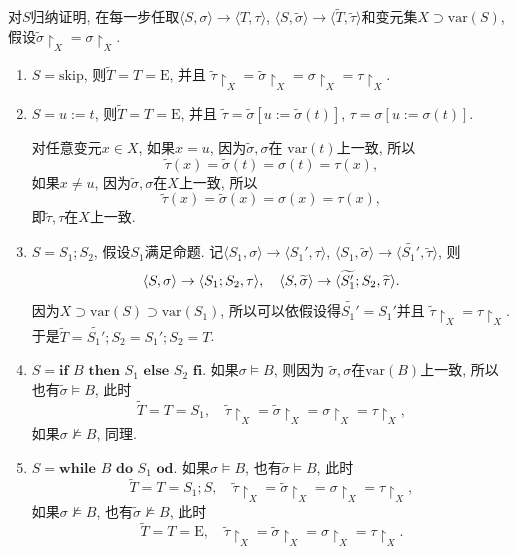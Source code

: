 \documentclass[UTF8]{ctexart}
\begin{document}
对$S$归纳证明, 在每一步任取$\langle S,\sigma\rangle\to\langle T,\tau\rangle$,
$\langle S,\widetilde{\sigma}\rangle\to
\langle\widetilde{T},\widetilde{\tau}\rangle$和变元集$X\supset\mathrm{var}(S)$,
假设$\widetilde{\sigma}\!\restriction_X=\sigma\!\restriction_X$.
\begin{enumerate}
    \item $S=\mathrm{skip}$, 则$\widetilde{T}=T=\mathrm{E}$, 并且
    $\widetilde{\tau}\!\restriction_X=\widetilde{\sigma}\!\restriction_X=
    \sigma\!\restriction_X=\tau\!\restriction_X$.

    \item $S=u:=t$, 则$\widetilde{T}=T=\mathrm{E}$, 并且
    $\widetilde{\tau}=\widetilde{\sigma}[u:=\widetilde{\sigma}(t)]$,
    $\tau=\sigma[u:=\sigma(t)]$.

    \hspace{2.17em}
    对任意变元$x\in X$, 如果$x=u$, 因为$\widetilde{\sigma},\sigma$在
    $\mathrm{var}(t)$上一致, 所以
    \[
        \widetilde{\tau}(x)=\widetilde{\sigma}(t)=\sigma(t)=\tau(x),
    \]
    如果$x\neq u$, 因为$\widetilde{\sigma},\sigma$在$X$上一致, 所以
    \[
        \widetilde{\tau}(x)=\widetilde{\sigma}(x)=\sigma(x)=\tau(x),
    \]
    即$\widetilde{\tau},\tau$在$X$上一致.

    \item $S=S_1;S_2$, 假设$S_1$满足命题. 记$\langle S_1,\sigma\rangle\to
    \langle S_1',\tau\rangle$, $\langle S_1,\widetilde{\sigma}\rangle\to
    \langle\widetilde{S_1'},\widetilde{\tau}\rangle$, 则
    \[
        \langle S,\sigma\rangle\to\langle S_1;S_2,\tau\rangle,\quad
        \langle S,\widetilde{\sigma}\rangle\to
        \langle\widetilde{S_1'};S_2,\widetilde{\tau}\rangle.\\[3pt]
    \]
    因为$X\supset\mathrm{var}(S)\supset\mathrm{var}(S_1)$,
    所以可以依假设得$\widetilde{S_1'}=S_1'$并且
    $\widetilde{\tau}\!\restriction_X=\tau\!\restriction_X$.
    于是$\widetilde{T}=\widetilde{S_1'};S_2=S_1';S_2=T$.

    \vspace{3pt}
    \item $S=\mathbf{if}\,\,B\,\,\mathbf{then}\,\,S_1\,\,\mathbf{else}\,\,
    S_2\,\,\mathbf{fi}$. 如果$\sigma\models B$, 则因为
    $\widetilde{\sigma},\sigma$在$\mathrm{var}(B)$上一致,
    所以也有$\widetilde{\sigma}\models B$, 此时
    \[
        \widetilde{T}=T=S_1,\quad
        \widetilde{\tau}\!\restriction_X=\widetilde{\sigma}\!\restriction_X=
        \sigma\!\restriction_X=\tau\!\restriction_X,
    \]
    如果$\sigma\not\models B$, 同理.

    \item $S=\mathbf{while}\,\,B\,\,\mathbf{do}\,\,S_1\,\,\mathbf{od}$.
    如果$\sigma\models B$, 也有$\widetilde{\sigma}\models B$, 此时
    \[
        \widetilde{T}=T=S_1;S,\quad
        \widetilde{\tau}\!\restriction_X=\widetilde{\sigma}\!\restriction_X=
        \sigma\!\restriction_X=\tau\!\restriction_X,
    \]
    如果$\sigma\not\models B$, 也有$\widetilde{\sigma}\not\models B$, 此时
    \[
        \widetilde{T}=T=\mathrm{E},\quad
        \widetilde{\tau}\!\restriction_X=\widetilde{\sigma}\!\restriction_X=
        \sigma\!\restriction_X=\tau\!\restriction_X.
    \]
\end{enumerate}
\end{document}
